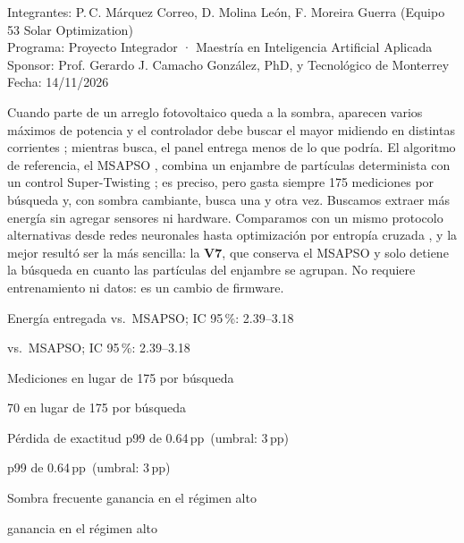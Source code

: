 \documentclass[letterpaper,11pt]{article}
\newcommand{\cifra}[5]{%
  \begingroup\setlength{\fboxsep}{5pt}%
  \colorbox{#1}{\parbox[t]{\dimexpr\linewidth-2\fboxsep\relax}{%
    \setstretch{1}\color{#2}{\Large\bfseries #3}\par
    #4%
    \ifx\relax#5\relax\else\par{\footnotesize #5}\fi}}%
  \endgroup}
\newcommand{\cifragris}[4]{\cifra{black!8}{black}{#1}{#2}{#3}}
\newcommand{\pp}{\,pp}
\begin{document}
\thispagestyle{primera}

\smallskip
\noindent{\large\textcolor{black!60}{Resumen ejecutivo · Más energía solar bajo sombra parcial con un ajuste de firmware}\par}
\medskip

\noindent\begingroup\setlength{\fboxsep}{7pt}%
\colorbox{black!8}{\parbox{\dimexpr\linewidth-2\fboxsep\relax}{\small{}%
\textcolor{black!60}{Integrantes:} P.\,C. Márquez Correo, D. Molina León, F. Moreira Guerra (Equipo 53 Solar Optimization)\\
\textcolor{black!60}{Programa:} Proyecto Integrador · Maestría en Inteligencia Artificial Aplicada\\
\textcolor{black!60}{Sponsor:} Prof. Gerardo J. Camacho González, PhD, y Tecnológico de Monterrey \quad \textcolor{black!60}{Fecha:} 14/11/2026}}%
\endgroup\par\medskip

Cuando parte de un arreglo fotovoltaico queda a la sombra, aparecen varios máximos de potencia y el controlador debe buscar el mayor midiendo en distintas corrientes \parencite{endiz2025}; mientras busca, el panel entrega menos de lo que podría. El algoritmo de referencia, el MSAPSO \parencite{hybridmppt2025}, combina un enjambre de partículas determinista \parencite{kennedy1995,rajendran2016} con un control Super-Twisting \parencite{levant2003}; es preciso, pero gasta siempre 175 mediciones por búsqueda y, con sombra cambiante, busca una y otra vez. Buscamos extraer más energía sin agregar sensores ni hardware. Comparamos con un mismo protocolo alternativas desde redes neuronales hasta optimización por entropía cruzada \parencite{rubinstein2004,tang2017,zhang2022}, y la mejor resultó ser la más sencilla: la \textbf{V7}, que conserva el MSAPSO y solo detiene la búsqueda en cuanto las partículas del enjambre se agrupan. No requiere entrenamiento ni datos: es un cambio de firmware.

\medskip
\noindent
\begin{minipage}[t]{0.235\linewidth}\cifragris{+2.78\pp}{Energía entregada}{vs.\ MSAPSO; IC 95\,\%: 2.39–3.18}{}\end{minipage}\hfill
\begin{minipage}[t]{0.235\linewidth}\cifragris{$-$60\,\%}{Mediciones}{70 en lugar de 175 por búsqueda}{}\end{minipage}\hfill
\begin{minipage}[t]{0.235\linewidth}\cifragris{0.05\pp}{Pérdida de exactitud}{p99 de 0.64\pp\ (umbral: 3\pp)}{}\end{minipage}\hfill
\begin{minipage}[t]{0.235\linewidth}\cifragris{+6.7\pp}{Sombra frecuente}{ganancia en el régimen alto}{}\end{minipage}
\medskip
\end{document}
